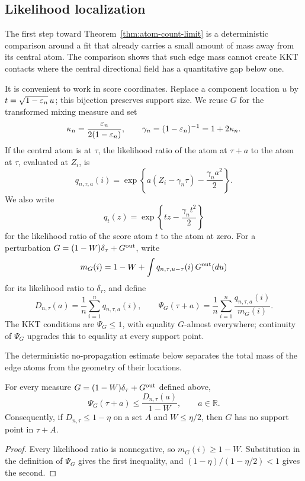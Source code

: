 \subsection{Likelihood localization}
\label{sec:support-likelihood-localization}

The first step toward Theorem~\ref{thm:atom-count-limit} is a deterministic
comparison around a fit that already carries a small amount of mass away from
its central atom. The comparison shows that such edge mass cannot create KKT
contacts where the central directional field has a quantitative gap below
one.

It is convenient to work in score coordinates. Replace a component location
\(u\) by \(t=\sqrt{1-\varepsilon_n}\,u\); this bijection preserves support size.
We reuse \(G\) for the transformed mixing measure and set
\[
    \kappa_n=\frac{\varepsilon_n}{2(1-\varepsilon_n)},
    \qquad
    \gamma_n=(1-\varepsilon_n)^{-1}=1+2\kappa_n.
\]
If the central atom is at
\(\tau\), the likelihood ratio of the atom at \(\tau+a\) to the atom at
\(\tau\), evaluated at \(Z_i\), is
\[
    q_{n,\tau,a}(i)
    =\exp\left\{a(Z_i-\gamma_n\tau)
                    -\frac{\gamma_na^2}{2}\right\}.
\]
We also write
\[
    q_t(z)=\exp\left\{tz-\frac{\gamma_nt^2}{2}\right\}
\]
for the likelihood ratio of the score atom \(t\) to the atom at zero.
For a perturbation \(G=(1-W)\delta_\tau+G^{\rm out}\), write
\[
    m_G(i)
    =1-W+\int q_{n,\tau,u-\tau}(i)\,G^{\rm out}(du)
\]
for its likelihood ratio to \(\delta_\tau\), and define
\[
    D_{n,\tau}(a)=\frac1n\sum_{i=1}^nq_{n,\tau,a}(i),
    \qquad
    \Psi_G(\tau+a)=\frac1n\sum_{i=1}^n
        \frac{q_{n,\tau,a}(i)}{m_G(i)}.
\]
The KKT conditions are \(\Psi_G\le1\), with equality \(G\)-almost everywhere;
continuity of \(\Psi_G\) upgrades this to equality at every support point.

The deterministic no-propagation estimate below separates the total mass of
the edge atoms from the geometry of their locations.
\begin{lemma}
\label{lem:support-no-percolation}
For every measure \(G=(1-W)\delta_\tau+G^{\rm out}\) defined above,
\[
    \Psi_G(\tau+a)\le \frac{D_{n,\tau}(a)}{1-W},
    \qquad a\in\mathbb R.
\]
Consequently, if \(D_{n,\tau}\le1-\eta\) on a set \(A\) and
\(W\le\eta/2\), then \(G\) has no support point in \(\tau+A\).
\end{lemma}

\begin{proof}
Every likelihood ratio is nonnegative, so \(m_G(i)\ge1-W\). Substitution in
the definition of \(\Psi_G\) gives the first inequality, and
\((1-\eta)/(1-\eta/2)<1\) gives the second. \qedhere
\end{proof}

